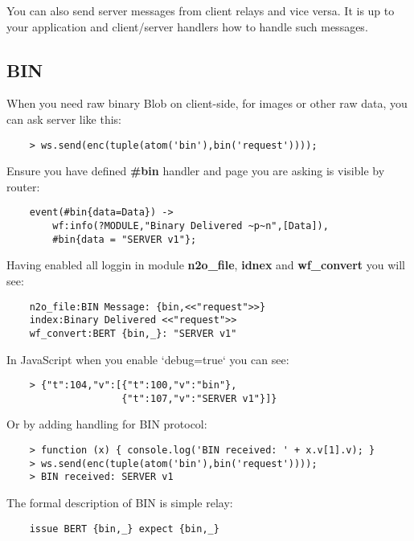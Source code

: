 You can also send server messages from client relays and vice versa.
It is up to your application and client/server handlers how to handle such messages.

\newpage
\subsection{BIN}

When you need raw binary Blob on client-side,
for images or other raw data, you can ask server like this:

\vspace{1\baselineskip}
\begin{lstlisting}
    > ws.send(enc(tuple(atom('bin'),bin('request'))));
\end{lstlisting}
\vspace{1\baselineskip}

Ensure you have defined {\bf \#bin} handler and page you are
asking is visible by router:

\vspace{1\baselineskip}
\begin{lstlisting}
    event(#bin{data=Data}) ->
        wf:info(?MODULE,"Binary Delivered ~p~n",[Data]),
        #bin{data = "SERVER v1"};
\end{lstlisting}
\vspace{1\baselineskip}

Having enabled all loggin in module {\bf n2o\_file}, {\bf idnex} and {\bf wf\_convert}
you will see:

\vspace{1\baselineskip}
\begin{lstlisting}
    n2o_file:BIN Message: {bin,<<"request">>}
    index:Binary Delivered <<"request">>
    wf_convert:BERT {bin,_}: "SERVER v1"
\end{lstlisting}
\vspace{1\baselineskip}

In JavaScript when you enable `debug=true` you can see:

\vspace{1\baselineskip}
\begin{lstlisting}
    > {"t":104,"v":[{"t":100,"v":"bin"},
                    {"t":107,"v":"SERVER v1"}]}
\end{lstlisting}
\vspace{1\baselineskip}

Or by adding handling for BIN protocol:

\vspace{1\baselineskip}
\begin{lstlisting}
    > function (x) { console.log('BIN received: ' + x.v[1].v); }
    > ws.send(enc(tuple(atom('bin'),bin('request'))));
    > BIN received: SERVER v1
\end{lstlisting}
\vspace{1\baselineskip}

The formal description of BIN is simple relay:

\vspace{1\baselineskip}
\begin{lstlisting}
    issue BERT {bin,_} expect {bin,_}
\end{lstlisting}
\vspace{1\baselineskip}
